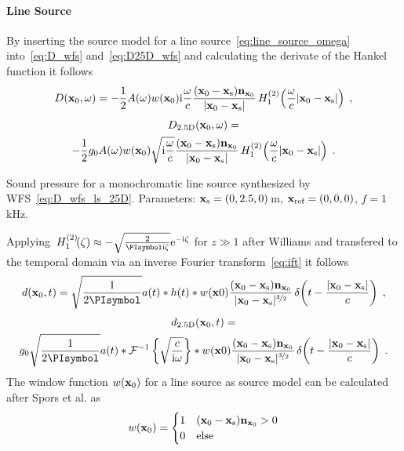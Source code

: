 \paragraph{Line Source}
%
%
By inserting the source model for a line source~\eqref{eq:line_source_omega}
into~\eqref{eq:D_wfs} and~\eqref{eq:D25D_wfs} and calculating the derivate of
the Hankel function\autocite[][(9.1.30)]{Abramowitz1972} it follows
%
\begin{equation}
    D(\x_0,\omega) = -\frac{1}{2}A(\omega) w(\x_0) \I\omegac
    \frac{(\x_0-\xs)\n_{\x_0}}{|\x_0-\xs|}
    \H{1}{2}\left(\omegac|\x_0-\xs|\right) \qc
    \label{eq:D_wfs_ls}
\end{equation}
%
\begin{multline}
    D_\twohalfD(\x_0,\omega) = \\
    -\frac{1}{2}g_0 A(\omega) w(\x_0) \sqrt{\I\omegac}
    \frac{(\x_0-\xs)\n_{\x_0}}{|\x_0-\xs|}
    \H{1}{2}\left(\omegac|\x_0-\xs|\right) \qp
    \label{eq:D_wfs_ls_25D}
\end{multline}
%
\begin{marginfigure}
    \centering
    \ft
    
    \caption{Sound pressure for a monochromatic line source synthesized by
        \twohalfD \ac{WFS}~\eqref{eq:D_wfs_ls_25D}. Parameters: $\mathbf{x}_\text{s} = (0,2.5,0)$\,m,
        $\mathbf{x}_\text{ref} = (0,0,0)$, $f = 1$\,kHz.
        }
\end{marginfigure}
%
Applying $\H{1}{2}(\zeta) \approx -\sqrt{\frac{2}{\PI \I\zeta}} \E^{-\I\zeta}$ for $z\gg1$ after
Williams and transfered to the
temporal domain via an inverse Fourier
transform~\eqref{eq:ift} it follows
%
\begin{equation}
    d(\x_0,t) = \sqrt{\frac{1}{2\PI}} a(t) * h(t) *
    w(\x0) \frac{(\x_0-\xs)\n_{\x_0}}{|\x_0-\xs|^{\nicefrac{3}{2}}}
    \deltafunc{t-\frac{|\x_0-\xs|}{c}} \qc
    \label{eq:d_wfs_ls}
\end{equation}
%
\begin{multline}
    d_\twohalfD(\x_0,t) = \\
    g_0 \sqrt{\frac{1}{2\PI}} a(t) *
    \IFT{\sqrt{\frac{c}{\I\omega}}} * w(\x0)
    \frac{(\x_0-\xs)\n_{\x_0}}{|\x_0-\xs|^{\nicefrac{3}{2}}}
    \deltafunc{t-\frac{|\x_0-\xs|}{c}} \qp
    \label{eq:d_wfs_ls_25D}
\end{multline}
%
The window function $w(\mathbf{x}_0)$ for a line source as source model can be
calculated after Spors et al. as\autocite{Spors2008}
%
\begin{equation}
    w(\x_0) = 
    \begin{cases}
        1 & (\x_0-\xs) \n_{\x_0} > 0 \\
        0 & \text{else}
    \end{cases}
    \label{eq:w_ls}
\end{equation}
%



